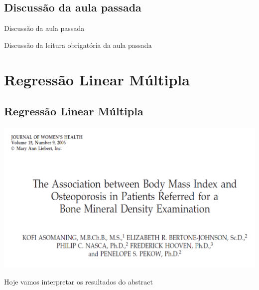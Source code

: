 \documentclass{beamer}
\begin{document}
\subsection{Discussão da aula passada}

\begin{frame}{Discussão da aula passada}
  \begin{block}{}
    Discussão da leitura obrigatória da aula passada
  \end{block}
\end{frame}

\section{Regressão Linear Múltipla}

\subsection{Regressão Linear Múltipla}

\begin{frame}{}
  \begin{center}
    \includegraphics[width=\textwidth]{Cap18-19/bmi-bmd-title}
  \end{center}
\end{frame}

\begin{frame}
  \begin{center}
    Hoje vamos interpretar os resultados do abstract
  \end{center}
\end{frame}
\end{document}
